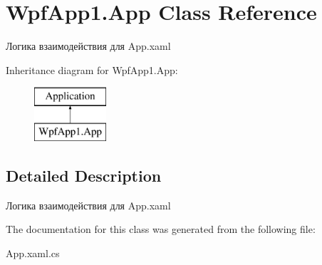 \hypertarget{class_wpf_app1_1_1_app}{}\section{Wpf\+App1.\+App Class Reference}
\label{class_wpf_app1_1_1_app}


Логика взаимодействия для App.\+xaml  


Inheritance diagram for Wpf\+App1.\+App\+:\begin{figure}[H]
\begin{center}
\leavevmode
\includegraphics[height=2.000000cm]{class_wpf_app1_1_1_app}
\end{center}
\end{figure}


\subsection{Detailed Description}
Логика взаимодействия для App.\+xaml 



The documentation for this class was generated from the following file\+:\begin{DoxyCompactItemize}
\item 
App.\+xaml.\+cs\end{DoxyCompactItemize}
